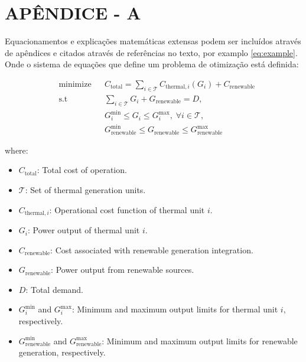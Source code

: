 
\chapter{APÊNDICE - A}\label{ap:A}

Equacionamentos e explicações matemáticas extensas podem ser incluídos através de apêndices e citados através de referências no texto, por examplo \eqref{eq:example}. Onde o sistema de equações que define um problema de otimização está definida:

\begin{equation}\label{eq:example}
	\begin{aligned}
	& \text{minimize}
	& & C_{\text{total}} = \sum_{i \in \mathcal{T}} C_{\text{thermal},i}(G_i) + C_{\text{renewable}} \\
	& \text{s.t}
	& & \sum_{i \in \mathcal{T}} G_i + G_{\text{renewable}} = D, \\
	&&& G_i^{\text{min}} \leq G_i \leq G_i^{\text{max}}, \; \forall i \in \mathcal{T}, \\
	&&& G_{\text{renewable}}^{\text{min}} \leq G_{\text{renewable}} \leq G_{\text{renewable}}^{\text{max}}
	\end{aligned}
\end{equation}
	
where:
\begin{itemize}
		\item $C_{\text{total}}$: Total cost of operation.
		\item $\mathcal{T}$: Set of thermal generation units.
		\item $C_{\text{thermal},i}$: Operational cost function of thermal unit $i$.
		\item $G_i$: Power output of thermal unit $i$.
		\item $C_{\text{renewable}}$: Cost associated with renewable generation integration.
		\item $G_{\text{renewable}}$: Power output from renewable sources.
		\item $D$: Total demand.
		\item $G_i^{\text{min}}$ and $G_i^{\text{max}}$: Minimum and maximum output limits for thermal unit $i$, respectively.
		\item $G_{\text{renewable}}^{\text{min}}$ and $G_{\text{renewable}}^{\text{max}}$: Minimum and maximum output limits for renewable generation, respectively.
\end{itemize}
